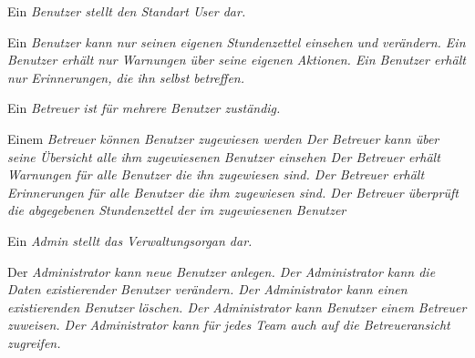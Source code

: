 \begin{requirements}
    Ein \em{Benutzer} stellt den Standart User dar.
    \begin{requirements}
         Ein \em{Benutzer} kann nur seinen eigenen \em{Stundenzettel} einsehen und verändern.
         Ein \em{Benutzer} erhält nur \em{Warnungen} über seine eigenen Aktionen.
         Ein \em{Benutzer} erhält nur \em{Erinnerungen}, die ihn selbst betreffen.
    \end{requirements}

        Ein \em{Betreuer} ist für mehrere \em{Benutzer} zuständig.
        \begin{requirements}
             Einem \em{Betreuer} können \em{Benutzer} zugewiesen werden
             Der \em{Betreuer} kann über seine Übersicht alle ihm zugewiesenen \em{Benutzer} einsehen
             Der \em{Betreuer} erhält \em{Warnungen} für alle \em{Benutzer} die ihn zugewiesen sind.
             Der \em{Betreuer} erhält \em{Erinnerungen} für alle \em{Benutzer} die ihm zugewiesen sind.
             Der \em{Betreuer} überprüft die \em{abgegebenen Stundenzettel} der im zugewiesenen \em{Benutzer}
        \end{requirements}

        Ein \em{Admin} stellt das Verwaltungsorgan dar.
        \begin{requirements}
             Der \em{Administrator} kann neue \em{Benutzer} anlegen.
             Der \em{Administrator} kann die Daten existierender \em{Benutzer} verändern.
             Der \em{Administrator} kann einen existierenden \em{Benutzer} löschen.
             Der \em{Administrator} kann \em{Benutzer} einem \em{Betreuer} zuweisen.
             Der \em{Administrator} kann für jedes \em{Team} auch auf die \em{Betreueransicht} zugreifen.
        \end{requirements}
\end{requirements}

